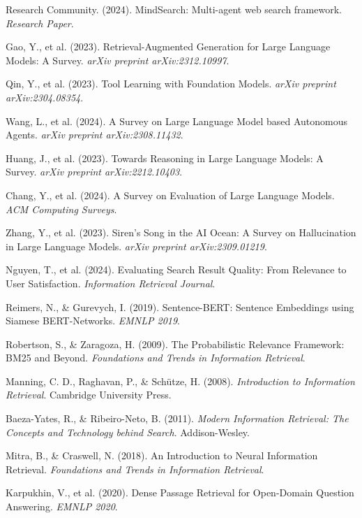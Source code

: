 \documentclass[12pt,a4paper]{article}
\begin{document}
\begin{thebibliography}{99}
Research Community. (2024). MindSearch: Multi-agent web search framework. \textit{Research Paper}.

Gao, Y., et al. (2023). Retrieval-Augmented Generation for Large Language Models: A Survey. \textit{arXiv preprint arXiv:2312.10997}.

Qin, Y., et al. (2023). Tool Learning with Foundation Models. \textit{arXiv preprint arXiv:2304.08354}.

Wang, L., et al. (2024). A Survey on Large Language Model based Autonomous Agents. \textit{arXiv preprint arXiv:2308.11432}.

Huang, J., et al. (2023). Towards Reasoning in Large Language Models: A Survey. \textit{arXiv preprint arXiv:2212.10403}.

Chang, Y., et al. (2024). A Survey on Evaluation of Large Language Models. \textit{ACM Computing Surveys}.

Zhang, Y., et al. (2023). Siren's Song in the AI Ocean: A Survey on Hallucination in Large Language Models. \textit{arXiv preprint arXiv:2309.01219}.

Nguyen, T., et al. (2024). Evaluating Search Result Quality: From Relevance to User Satisfaction. \textit{Information Retrieval Journal}.

Reimers, N., \& Gurevych, I. (2019). Sentence-BERT: Sentence Embeddings using Siamese BERT-Networks. \textit{EMNLP 2019}.

Robertson, S., \& Zaragoza, H. (2009). The Probabilistic Relevance Framework: BM25 and Beyond. \textit{Foundations and Trends in Information Retrieval}.

Manning, C. D., Raghavan, P., \& Schütze, H. (2008). \textit{Introduction to Information Retrieval}. Cambridge University Press.

Baeza-Yates, R., \& Ribeiro-Neto, B. (2011). \textit{Modern Information Retrieval: The Concepts and Technology behind Search}. Addison-Wesley.

Mitra, B., \& Craswell, N. (2018). An Introduction to Neural Information Retrieval. \textit{Foundations and Trends in Information Retrieval}.

Karpukhin, V., et al. (2020). Dense Passage Retrieval for Open-Domain Question Answering. \textit{EMNLP 2020}.


\end{thebibliography}
\end{document}

